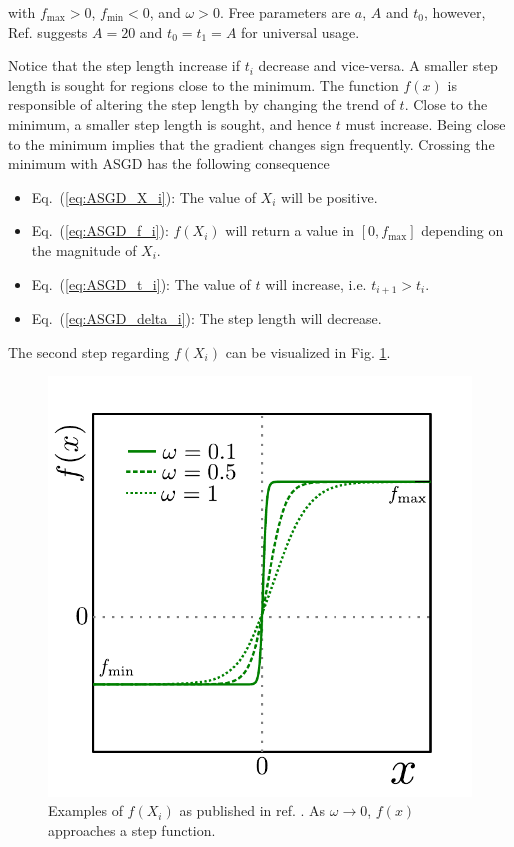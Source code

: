 with $f_\mathrm{max} > 0$, $f_\mathrm{min} < 0$, and $\omega > 0$. Free parameters are $a$, $A$ and $t_0$, however, Ref. \cite{ASGD} suggests $A=20$ and $t_0=t_1=A$ for universal usage.

Notice that the step length increase if $t_i$ decrease and vice-versa. A smaller step length is sought for regions close to the minimum. The function $f(x)$ is responsible of altering the step length by changing the trend of $t$. Close to the minimum, a smaller step length is sought, and hence $t$ must increase. Being close to the minimum implies that the gradient changes sign frequently. Crossing the minimum with ASGD has the following consequence

\begin{itemize}
 \item Eq.~(\ref{eq:ASGD_X_i}): The value of $X_i$ will be positive.
 \item Eq.~(\ref{eq:ASGD_f_i}): $f(X_i)$ will return a value in $[0, f_\mathrm{max}]$ depending on the magnitude of $X_i$.
 \item Eq.~(\ref{eq:ASGD_t_i}): The value of $t$ will increase, i.e. $t_{i+1} > t_i$.
 \item Eq.~(\ref{eq:ASGD_delta_i}): The step length will decrease.
\end{itemize}

The second step regarding $f(X_i)$ can be visualized in Fig. \ref{fig:f_ASGD}.

\begin{figure}
 \begin{center}
  \includegraphics[scale=0.75]{../Graphics/ASGD_f.pdf}
  \caption{Examples of $f(X_i)$ as published in ref. \cite{ASGD}. As $\omega\to0$, $f(x)$ approaches a step function.}
  \label{fig:f_ASGD}
 \end{center}
\end{figure}

